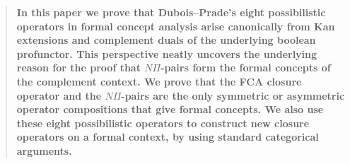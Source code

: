 
\begin{abstract}
    \textbf{In this paper we prove that Dubois--Prade's eight possibilistic operators in formal concept analysis arise canonically from Kan extensions and complement duals of the underlying boolean profunctor. This perspective neatly uncovers the underlying reason for the proof that $N\Pi$-pairs form the formal concepts of the complement context. We prove that the FCA closure operator and the $N\Pi$-pairs are the only symmetric or asymmetric operator compositions that give formal concepts. We also use these eight possibilistic operators to construct new closure operators on a formal context, by using standard categorical arguments.} 
\end{abstract}